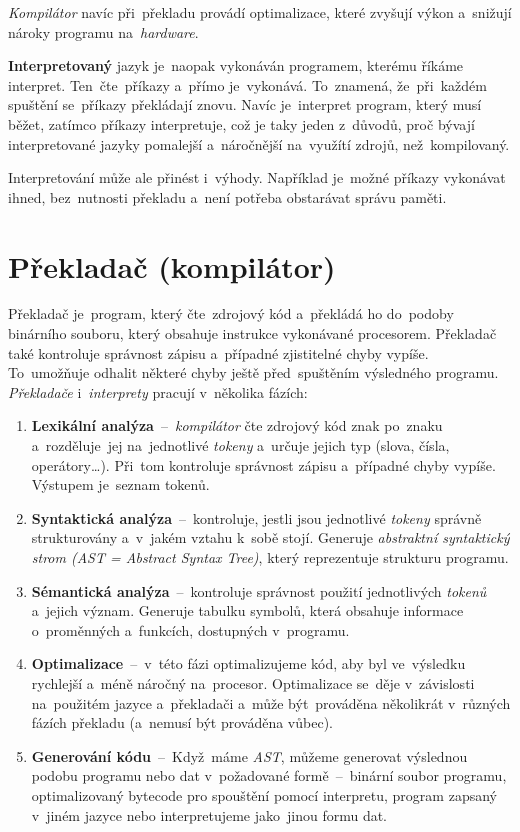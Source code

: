 \documentclass[11pt,a4paper]{report}
\begin{document}
            \emph{Kompilátor} navíc při~překladu provádí optimalizace, které zvyšují výkon a~snižují nároky programu na~\emph{hardware}.

            \textbf{Interpretovaný} jazyk je~naopak vykonáván programem, kterému říkáme interpret. Ten~čte~příkazy a~přímo je~vykonává. To~znamená, že~při~každém spuštění se~příkazy překládají znovu. Navíc je~interpret program, který musí běžet, zatímco příkazy interpretuje, což je taky jeden z~důvodů, proč bývají interpretované jazyky pomalejší a~náročnější na~využítí zdrojů, než~kompilovaný.
            
            Interpretování může ale přinést i~výhody. Například je~možné příkazy vykonávat ihned, bez~nutnosti překladu a~není potřeba obstarávat správu paměti. \cite{ueda:compiled}
        
        \section{Překladač (kompilátor)}
            Překladač je~program, který čte~zdrojový kód a~překládá ho do~podoby binárního souboru, který obsahuje instrukce vykonávané procesorem. Překladač také kontroluje správnost zápisu a~případné zjistitelné chyby vypíše. To~umožňuje odhalit některé chyby ještě před~spuštěním výsledného programu.
            \emph{Překladače} i~\emph{interprety} pracují v~několika fázích:
            \begin{enumerate}
                \item \textbf{Lexikální analýza}~--~\emph{kompilátor} čte zdrojový kód znak po~znaku a~rozděluje~jej na~jednotlivé \emph{tokeny} a~určuje jejich typ (slova, čísla, operátory\dots). Při~tom kontroluje správnost zápisu a~případné chyby vypíše. Výstupem je~seznam tokenů.
                \item \textbf{Syntaktická analýza}~--~kontroluje, jestli jsou jednotlivé \emph{tokeny} správně strukturovány a~v~jakém vztahu k~sobě stojí. Generuje \emph{abstraktní syntaktický strom (AST = Abstract Syntax Tree)}, který reprezentuje strukturu programu.
                \item \textbf{Sémantická analýza}~--~kontroluje správnost použití jednotlivých \emph{tokenů} a~jejich význam. Generuje tabulku symbolů, která obsahuje informace o~proměnných a~funkcích, dostupných v~programu.
                \item \textbf{Optimalizace}~--~v~této fázi optimalizujeme kód, aby byl ve~výsledku rychlejší a~méně náročný na~procesor. Optimalizace se~děje v~závislosti na~použitém jazyce a~překladači a~může být~prováděna několikrát v~různých fázích překladu (a~nemusí být prováděna vůbec).
                \item \textbf{Generování kódu}~--~Když~máme \emph{AST}, můžeme generovat výslednou podobu programu nebo dat v~požadované formě~--~binární soubor programu, optimalizovaný bytecode pro spouštění pomocí interpretu, program zapsaný v~jiném jazyce nebo interpretujeme jako~jinou formu dat.
            \end{enumerate} \cite{baeldungCompilersWork, compilers}
\end{document}
